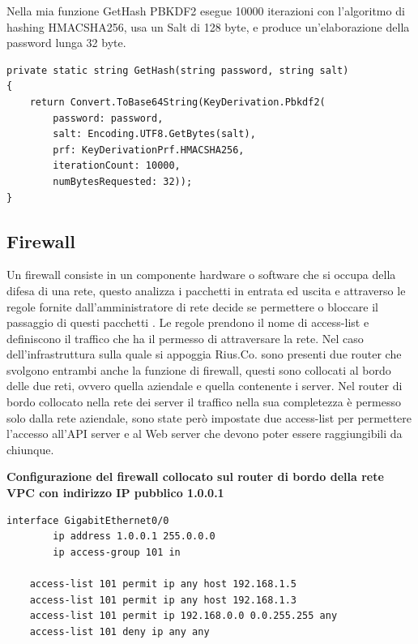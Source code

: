 \medskip
Nella mia funzione GetHash PBKDF2 esegue 10000 iterazioni con l'algoritmo di hashing HMACSHA256, usa un Salt di 128 byte, e produce un'elaborazione della password lunga 32 byte. 
\smallskip

\begin{lstlisting}[style=csharp]
private static string GetHash(string password, string salt)
{
    return Convert.ToBase64String(KeyDerivation.Pbkdf2(
        password: password,
        salt: Encoding.UTF8.GetBytes(salt),
        prf: KeyDerivationPrf.HMACSHA256,
        iterationCount: 10000,
        numBytesRequested: 32));
}
\end{lstlisting}
\subsection{Firewall}
Un firewall consiste in un componente hardware o software che si occupa della difesa di una rete, questo analizza i pacchetti in entrata ed uscita e attraverso le regole fornite dall'amministratore di rete decide se permettere o bloccare il passaggio di questi pacchetti \cite{Firewall}. Le regole prendono il nome di access-list e definiscono il traffico che ha il permesso di attraversare la rete. Nel caso dell'infrastruttura sulla quale si appoggia Rius.Co. sono presenti due router che svolgono entrambi anche la funzione di firewall, questi sono collocati al bordo delle due reti, ovvero quella aziendale e quella contenente i server. Nel router di bordo collocato nella rete dei server il traffico nella sua completezza è permesso solo dalla rete aziendale, sono state però impostate due access-list per permettere l'accesso all'API server e al Web server che devono poter essere raggiungibili da chiunque. 
\bigskip

\textbf{Configurazione del firewall collocato sul router di bordo della rete VPC con indirizzo IP pubblico 1.0.0.1}
\begin{lstlisting}[style=dos]
    interface GigabitEthernet0/0
        ip address 1.0.0.1 255.0.0.0
        ip access-group 101 in
        
    access-list 101 permit ip any host 192.168.1.5
    access-list 101 permit ip any host 192.168.1.3
    access-list 101 permit ip 192.168.0.0 0.0.255.255 any
    access-list 101 deny ip any any
\end{lstlisting}
